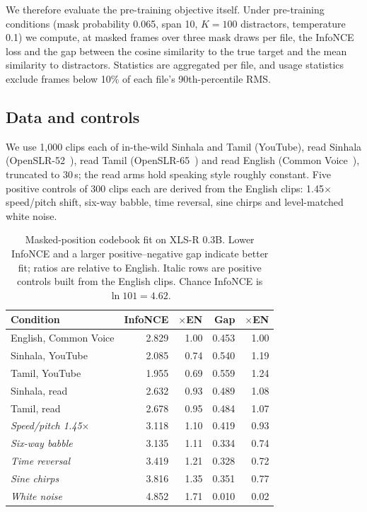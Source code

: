 \documentclass{article}
\begin{document}
We therefore evaluate the pre-training objective itself. Under pre-training conditions (mask probability 0.065, span 10, $K{=}100$ distractors, temperature 0.1) we compute, at masked frames over three mask draws per file, the InfoNCE loss and the gap between the cosine similarity to the true target and the mean similarity to distractors. Statistics are aggregated per file, and usage statistics exclude frames below 10\% of each file's 90th-percentile RMS.

\subsection{Data and controls}

We use 1,000 clips each of in-the-wild Sinhala and Tamil (YouTube), read Sinhala (OpenSLR-52~\cite{kjartansson2018crowd}), read Tamil (OpenSLR-65~\cite{he2020open}) and read English (Common Voice~\cite{ardila2020commonvoice}), truncated to 30\,s; the read arms hold speaking style roughly constant. Five positive controls of 300 clips each are derived from the English clips: 1.45$\times$ speed/pitch shift, six-way babble, time reversal, sine chirps and level-matched white noise.

\begin{table}[t]
\caption{Masked-position codebook fit on XLS-R 0.3B. Lower InfoNCE and a larger positive--negative gap indicate better fit; ratios are relative to English. Italic rows are positive controls built from the English clips. Chance InfoNCE is $\ln 101 = 4.62$.}
\label{tab:fit}
\vspace{3pt}
\centering\small
\setlength{\tabcolsep}{5pt}
\begin{tabular}{lrrrr}
\toprule
Condition & InfoNCE & $\times$EN & Gap & $\times$EN \\
\midrule
English, Common Voice & 2.829 & 1.00 & 0.453 & 1.00 \\
Sinhala, YouTube      & 2.085 & 0.74 & 0.540 & 1.19 \\
Tamil, YouTube        & 1.955 & 0.69 & 0.559 & 1.24 \\
Sinhala, read         & 2.632 & 0.93 & 0.489 & 1.08 \\
Tamil, read           & 2.678 & 0.95 & 0.484 & 1.07 \\
\midrule
\emph{Speed/pitch 1.45$\times$} & 3.118 & 1.10 & 0.419 & 0.93 \\
\emph{Six-way babble}           & 3.135 & 1.11 & 0.334 & 0.74 \\
\emph{Time reversal}            & 3.419 & 1.21 & 0.328 & 0.72 \\
\emph{Sine chirps}              & 3.816 & 1.35 & 0.351 & 0.77 \\
\emph{White noise}              & 4.852 & 1.71 & 0.010 & 0.02 \\
\bottomrule
\end{tabular}
\end{table}
\end{document}
